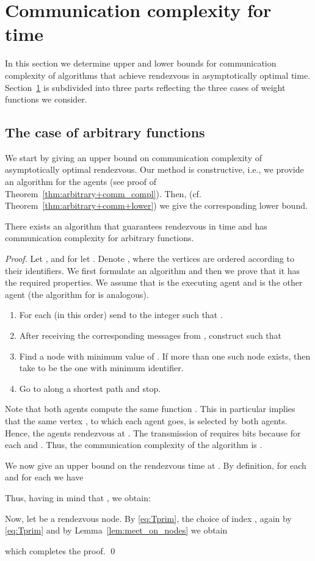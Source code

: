 \documentclass{llncs}
\begin{document}
\section{Communication complexity for  time} \label{sec:comm-compl}
In this section we determine upper and lower bounds for communication complexity of algorithms that achieve rendezvous in asymptotically optimal time.
Section~\ref{sec:comm-compl} is subdivided into three parts reflecting the three cases of weight functions we consider.

\subsection{The case of arbitrary functions}
We start by giving an upper bound on communication complexity of asymptotically optimal rendezvous.
Our method is constructive, i.e., we provide an algorithm for the agents (see proof of Theorem~\ref{thm:arbitrary+comm_compl}).
Then, (cf. Theorem~\ref{thm:arbitrary+comm+lower}) we give the corresponding lower bound.

\begin{theorem} \label{thm:arbitrary+comm_compl}
There exists an algorithm 
that guarantees rendezvous in   time 
and has communication complexity  for arbitrary functions. 
\end{theorem}
\begin{proof}
Let , and for  let .
Denote , where the vertices are ordered according to their identifiers.
We first formulate an algorithm and then we prove that it has the required properties.
We assume that  is the executing agent and  is the other agent (the algorithm for  is analogous).
\begin{enumerate}
 \item For each  (in this order) send to  the integer  such that .
 \item After receiving the corresponding messages from , construct  such that
   
 \item Find a node  with minimum value of .
  If more than one such node  exists, then take  to be the one with minimum identifier.
 \item Go to  along a shortest path and stop.
\end{enumerate}

Note that both agents compute the same function .
This in particular implies that the same vertex , to which each agent goes, is selected by both agents.
Hence, the agents rendezvous at .
The transmission of  requires  bits because  
for each  and .
Thus, the communication complexity of the algorithm is .

\smallskip
We now give an upper bound on the rendezvous time at . By definition,  for each  
and for each  we have

Thus, having in mind that , we obtain:

Now, let  be a rendezvous node. By \eqref{eq:Tprim},  the choice of index , again by \eqref{eq:Tprim} and by
Lemma~\ref{lem:meet_on_nodes} we obtain

which completes the proof.
\qed\end{proof}
\end{document}

